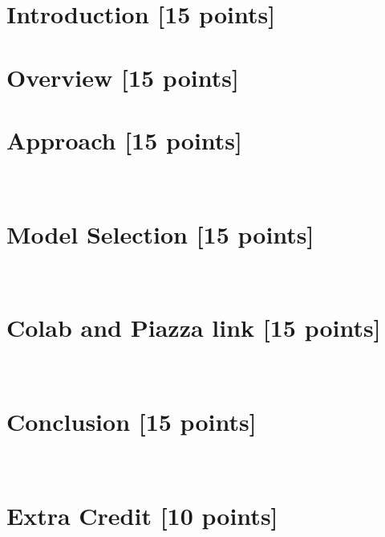 \newif\ifshowsolutions
\showsolutionstrue







\pagestyle{fancy}




\newpage

\section{Introduction [15 points]}
\newpage

\section{Overview [15 points]}
\newpage

\section{Approach [15 points]}
\newpage~

\section{Model Selection [15 points]}
\newpage~

\section{Colab and Piazza link [15 points]}
\newpage~

\section{Conclusion [15 points]}
\newpage~

\section{Extra Credit [10 points]}
\newpage~



